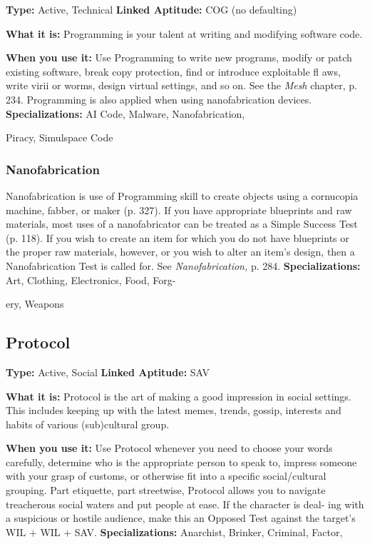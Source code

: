 \textbf{Type:} Active, Technical
\textbf{Linked Aptitude:} COG (no defaulting)

\textbf{What it is:} Programming is your talent at writing 
and modifying software code.

\textbf{When you use it:} Use Programming to write new 
programs, modify or patch existing software, break 
copy protection, find or introduce exploitable fl aws, 
write virii or worms, design virtual settings, and so 
on. See the \textit{Mesh} chapter, p. 234. Programming is also 
applied when using nanofabrication devices.
\textbf{Specializations:} AI Code, Malware, Nanofabrication, 

Piracy, Simulspace Code

\subsubsection{Nanofabrication}

Nanofabrication is use of Programming skill to create 
objects using a cornucopia machine, fabber, or maker 
(p. 327). If you have appropriate blueprints and raw 
materials, most uses of a nanofabricator can be treated 
as a Simple Success Test (p. 118). If you wish to create 
an item for which you do not have blueprints or the 
proper raw materials, however, or you wish to alter an 
item's design, then a Nanofabrication Test is called for. 
See \textit{Nanofabrication,} p. 284.
\textbf{Specializations:} Art, Clothing, Electronics, Food, Forg-

ery, Weapons

\subsection{Protocol}

\textbf{Type:} Active, Social
\textbf{Linked Aptitude:} SAV

\textbf{What it is:} Protocol is the art of making a good 
impression in social settings. This includes keeping 
up with the latest memes, trends, gossip, interests and 
habits of various (sub)cultural group.

\textbf{When you use it:} Use Protocol whenever you need 
to choose your words carefully, determine who is the 
appropriate person to speak to, impress someone with 
your grasp of customs, or otherwise fit into a specific 
social/cultural grouping. Part etiquette, part streetwise, 
Protocol allows you to navigate treacherous social 
waters and put people at ease. If the character is deal-
ing with a suspicious or hostile audience, make this an 
Opposed Test against the target's WIL + WIL + SAV.
\textbf{Specializations:} Anarchist, Brinker, Criminal, Factor, 

